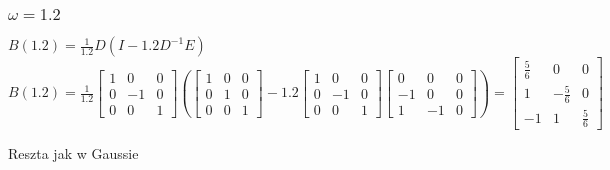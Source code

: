 \documentclass{article}
\begin{document}
\subsubsection{$\omega=1.2$}
$B(1.2)=\frac{1}{1.2}D(I-1.2D^{-1}E)$\\
$B(1.2)=\frac{1}{1.2}\begin{bmatrix} 1 & 0 & 0 \\ 0 & -1 & 0 \\ 0 & 0 & 1 \end{bmatrix}(\begin{bmatrix} 1 & 0 & 0 \\ 0 & 1 & 0 \\ 0 & 0 & 1 \end{bmatrix}-1.2\begin{bmatrix} 1 & 0 & 0 \\ 0 & -1 & 0 \\ 0 & 0 & 1 \end{bmatrix}\begin{bmatrix} 0 & 0 & 0 \\ -1 & 0 & 0 \\ 1 & -1 & 0 \end{bmatrix})=\begin{bmatrix} \frac{5}{6} & 0 & 0 \\ 1 & -\frac{5}{6} & 0 \\ -1 & 1 & \frac{5}{6} \end{bmatrix}$

Reszta jak w Gaussie
\end{document}
